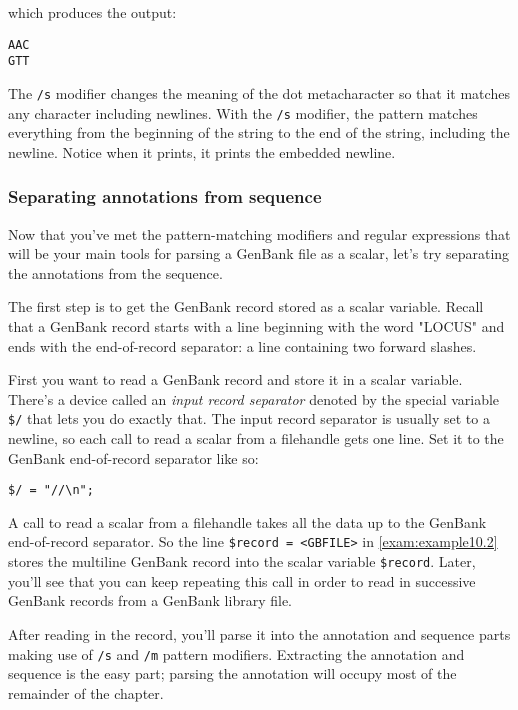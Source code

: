 which produces the output:

\begin{lstlisting}
AAC
GTT
\end{lstlisting}

The \verb|/s| modifier changes the meaning of the dot metacharacter so that it matches any character including newlines. With the \verb|/s| modifier, the pattern matches everything from the beginning of the string to the end of the string, including the newline. Notice when it prints, it prints the embedded newline. 

\subsubsection{Separating annotations from sequence}
Now that you've met the pattern-matching modifiers and regular expressions that will be your main tools for parsing a GenBank file as a scalar, let's try separating the annotations from the sequence.

The first step is to get the GenBank record stored as a scalar variable. Recall that a GenBank record starts with a line beginning with the word "LOCUS" and ends with the end-of-record separator: a line containing two forward slashes.

First you want to read a GenBank record and store it in a scalar variable. There's a device called an \textit{input record separator} denoted by the special variable \verb|$/| that lets you do exactly that. The input record separator is usually set to a newline, so each call to read a scalar from a filehandle gets one line. Set it to the GenBank end-of-record separator like so: 

\begin{lstlisting}
$/ = "//\n";
\end{lstlisting}

A call to read a scalar from a filehandle takes all the data up to the GenBank end-of-record separator. So the line \verb|$record = <GBFILE>| in \autoref{exam:example10.2} stores the multiline GenBank record into the scalar variable \verb|$record|. Later, you'll see that you can keep repeating this call in order to read in successive GenBank records from a GenBank library file.

After reading in the record, you'll parse it into the annotation and sequence parts making use of \verb|/s| and \verb|/m| pattern modifiers. Extracting the annotation and sequence is the easy part; parsing the annotation will occupy most of the remainder of the chapter.

